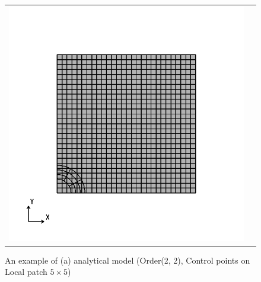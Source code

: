\begin{figure}[htbp]
  \begin{tabular}{cc}
    \begin{minipage}[t]{0.45\hsize}
      \centering
      \includegraphics[keepaspectratio, scale=0.3]
      {fig/result_data_etc/s-iga01/model/22.png}
      \caption{An example of (a) analytical model (Order(2, 2), Control points on Local patch $5\times 5$)}
      \label{fig:22}
    \end{minipage} &
    \begin{minipage}[t]{0.45\hsize}
      \centering
      \includegraphics[keepaspectratio, scale=0.3]

\end{minipage}
\end{tabular}
\end{figure}
